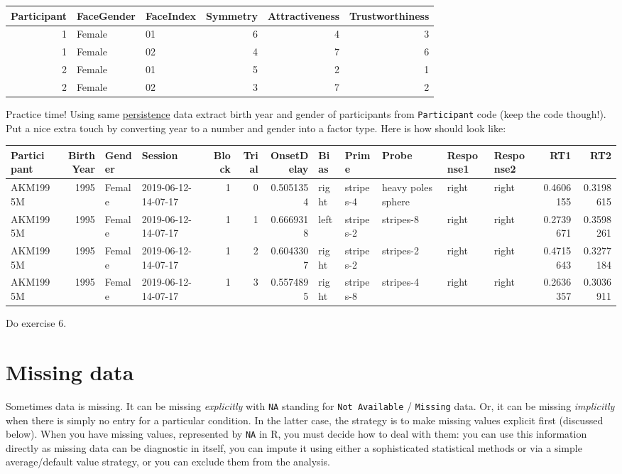 \documentclass[
]{book}
\begin{document}
\begin{tabular}{r|l|l|r|r|r}
\hline
Participant & FaceGender & FaceIndex & Symmetry & Attractiveness & Trustworthiness\\
\hline
1 & Female & 01 & 6 & 4 & 3\\
\hline
1 & Female & 02 & 4 & 7 & 6\\
\hline
2 & Female & 01 & 5 & 2 & 1\\
\hline
2 & Female & 02 & 3 & 7 & 2\\
\hline
\end{tabular}

Practice time! Using same \href{data/persistence.csv}{persistence} data extract birth year and gender of participants from \texttt{Participant} code (keep the code though!). Put a nice extra touch by converting year to a number and gender into a factor type. Here is how should look like:

\begin{tabular}{l|r|l|l|r|r|r|l|l|l|l|l|r|r}
\hline
Participant & BirthYear & Gender & Session & Block & Trial & OnsetDelay & Bias & Prime & Probe & Response1 & Response2 & RT1 & RT2\\
\hline
AKM1995M & 1995 & Female & 2019-06-12-14-07-17 & 1 & 0 & 0.5051354 & right & stripes-4 & heavy poles sphere & right & right & 0.4606155 & 0.3198615\\
\hline
AKM1995M & 1995 & Female & 2019-06-12-14-07-17 & 1 & 1 & 0.6669318 & left & stripes-2 & stripes-8 & right & right & 0.2739671 & 0.3598261\\
\hline
AKM1995M & 1995 & Female & 2019-06-12-14-07-17 & 1 & 2 & 0.6043307 & right & stripes-2 & stripes-2 & right & right & 0.4715643 & 0.3277184\\
\hline
AKM1995M & 1995 & Female & 2019-06-12-14-07-17 & 1 & 3 & 0.5574895 & right & stripes-8 & stripes-4 & right & right & 0.2636357 & 0.3036911\\
\hline
\end{tabular}

Do exercise 6.

\hypertarget{missing-data}{%
\section{Missing data}\label{missing-data}}

Sometimes data is missing. It can be missing \emph{explicitly} with \texttt{NA} standing for \texttt{Not\ Available} / \texttt{Missing} data. Or, it can be missing \emph{implicitly} when there is simply no entry for a particular condition. In the latter case, the strategy is to make missing values explicit first (discussed below). When you have missing values, represented by \texttt{NA} in R, you must decide how to deal with them: you can use this information directly as missing data can be diagnostic in itself, you can impute it using either a sophisticated statistical methods or via a simple average/default value strategy, or you can exclude them from the analysis.
\end{document}
